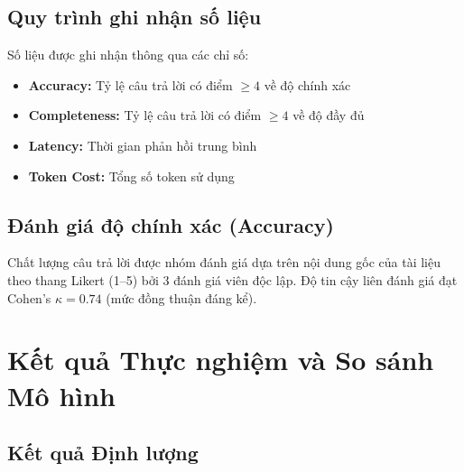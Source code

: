 \documentclass[10pt, conference, a4paper]{IEEEtran}
\begin{document}
\subsection{Quy trình ghi nhận số liệu}

Số liệu được ghi nhận thông qua các chỉ số:
\begin{itemize}
  \item \textbf{Accuracy:} Tỷ lệ câu trả lời có điểm $\geq 4$ về độ chính xác
  \item \textbf{Completeness:} Tỷ lệ câu trả lời có điểm $\geq 4$ về độ đầy đủ
  \item \textbf{Latency:} Thời gian phản hồi trung bình
  \item \textbf{Token Cost:} Tổng số token sử dụng
\end{itemize}

\subsection{Đánh giá độ chính xác (Accuracy)}

Chất lượng câu trả lời được nhóm đánh giá dựa trên nội dung gốc của
tài liệu theo thang Likert (1–5) bởi 3 đánh giá viên độc lập. Độ tin
cậy liên đánh giá đạt Cohen’s $\kappa = 0.74$ (mức đồng thuận đáng kể).

\section{Kết quả Thực nghiệm và So sánh Mô hình}

\subsection{Kết quả Định lượng}
\end{document}
